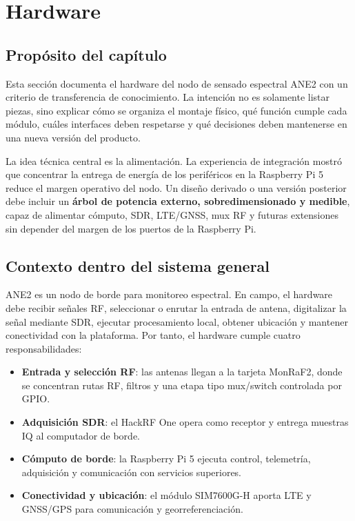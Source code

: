 \chapter{Hardware}

\section{Propósito del capítulo}

Esta sección documenta el hardware del nodo de sensado espectral ANE2 con un
criterio de transferencia de conocimiento. La intención no es solamente listar
piezas, sino explicar cómo se organiza el montaje físico, qué función cumple
cada módulo, cuáles interfaces deben respetarse y qué decisiones deben
mantenerse en una nueva versión del producto.

La idea técnica central es la alimentación. La experiencia de integración
mostró que concentrar la entrega de energía de los periféricos en la
Raspberry Pi 5 reduce el margen operativo del nodo. Un diseño derivado o una
versión posterior debe incluir un \textbf{árbol de potencia externo,
sobredimensionado y medible}, capaz de alimentar cómputo, SDR, LTE/GNSS, mux
RF y futuras extensiones sin depender del margen de los puertos de la Raspberry
Pi.

\section{Contexto dentro del sistema general}

ANE2 es un nodo de borde para monitoreo espectral. En campo, el hardware debe
recibir señales RF, seleccionar o enrutar la entrada de antena, digitalizar la
señal mediante SDR, ejecutar procesamiento local, obtener ubicación y
mantener conectividad con la plataforma. Por tanto, el hardware cumple cuatro
responsabilidades:

\begin{itemize}[leftmargin=*]
    \item \textbf{Entrada y selección RF}: las antenas llegan a la tarjeta
    MonRaF2, donde se concentran rutas RF, filtros y una etapa tipo mux/switch
    controlada por GPIO.
    \item \textbf{Adquisición SDR}: el HackRF One opera como receptor y entrega
    muestras IQ al computador de borde.
    \item \textbf{Cómputo de borde}: la Raspberry Pi 5 ejecuta control,
    telemetría, adquisición y comunicación con servicios superiores.
    \item \textbf{Conectividad y ubicación}: el módulo SIM7600G-H aporta LTE
    y GNSS/GPS para comunicación y georreferenciación.
\end{itemize}

